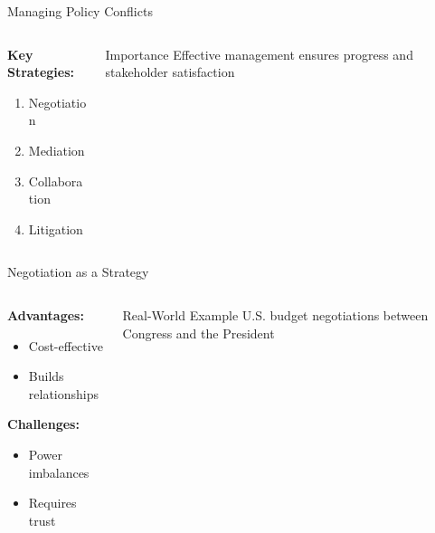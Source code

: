 \documentclass[10pt]{beamer}
\begin{document}
\begin{frame}{Managing Policy Conflicts}
    \begin{columns}[T]
        \begin{column}{0.5\textwidth}
            \textbf{Key Strategies:}
            \begin{enumerate}
                \item Negotiation 
                \item Mediation 
                \item Collaboration 
                \item Litigation 
            \end{enumerate}
        \end{column}
        \begin{column}{0.5\textwidth}
            \begin{alertblock}{Importance}
                Effective management ensures progress and stakeholder satisfaction
            \end{alertblock}
        \end{column}
    \end{columns}
\end{frame}

\begin{frame}{Negotiation as a Strategy}
    \begin{columns}[T]
        \begin{column}{0.5\textwidth}
            \textbf{Advantages:}
            \begin{itemize}
                \item Cost-effective
                \item Builds relationships
            \end{itemize}
            
            \textbf{Challenges:}
            \begin{itemize}
                \item Power imbalances
                \item Requires trust
            \end{itemize}
        \end{column}
        \begin{column}{0.5\textwidth}
            \begin{exampleblock}{Real-World Example}
                U.S. budget negotiations between Congress and the President
            \end{exampleblock}
        \end{column}
    \end{columns}
\end{frame}
\end{document}
